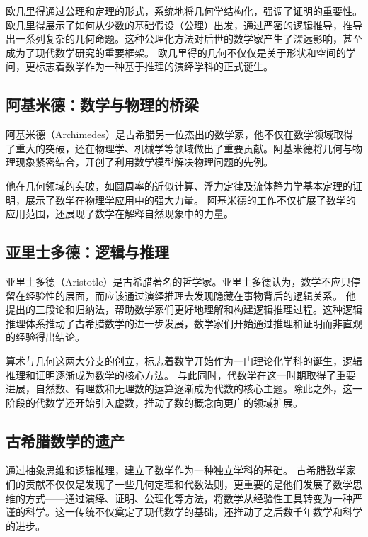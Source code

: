 欧几里得通过公理和定理的形式，系统地将几何学结构化，强调了证明的重要性。欧几里得展示了如何从少数的基础假设（公理）出发，通过严密的逻辑推导，推导出一系列复杂的几何命题。这种公理化方法对后世的数学家产生了深远影响，甚至成为了现代数学研究的重要框架。
欧几里得的几何不仅仅是关于形状和空间的学问，更标志着数学作为一种基于推理的演绎学科的正式诞生。

\subsection{阿基米德：数学与物理的桥梁}
阿基米德（Archimedes）是古希腊另一位杰出的数学家，他不仅在数学领域取得了重大的突破，还在物理学、机械学等领域做出了重要贡献。阿基米德将几何与物理现象紧密结合，开创了利用数学模型解决物理问题的先例。

他在几何领域的突破，如圆周率的近似计算、浮力定律及流体静力学基本定理的证明，展示了数学在物理学应用中的强大力量。
阿基米德的工作不仅扩展了数学的应用范围，还展现了数学在解释自然现象中的力量。

\subsection{亚里士多德：逻辑与推理}

亚里士多德（Aristotle）是古希腊著名的哲学家。亚里士多德认为，数学不应只停留在经验性的层面，而应该通过演绎推理去发现隐藏在事物背后的逻辑关系。
他提出的三段论和归纳法，帮助数学家们更好地理解和构建逻辑推理过程。这种逻辑推理体系推动了古希腊数学的进一步发展，数学家们开始通过推理和证明而非直观的经验得出结论。


算术与几何这两大分支的创立，标志着数学开始作为一门理论化学科的诞生，逻辑推理和证明逐渐成为数学的核心方法。
与此同时，代数学在这一时期取得了重要进展，自然数、有理数和无理数的运算逐渐成为代数的核心主题。除此之外，这一阶段的代数学还开始引入虚数，推动了数的概念向更广的领域扩展。

\subsection{古希腊数学的遗产}

通过抽象思维和逻辑推理，建立了数学作为一种独立学科的基础。
古希腊数学家们的贡献不仅仅是发现了一些几何定理和代数法则，更重要的是他们发展了数学思维的方式——通过演绎、证明、公理化等方法，将数学从经验性工具转变为一种严谨的科学。这一传统不仅奠定了现代数学的基础，还推动了之后数千年数学和科学的进步。


